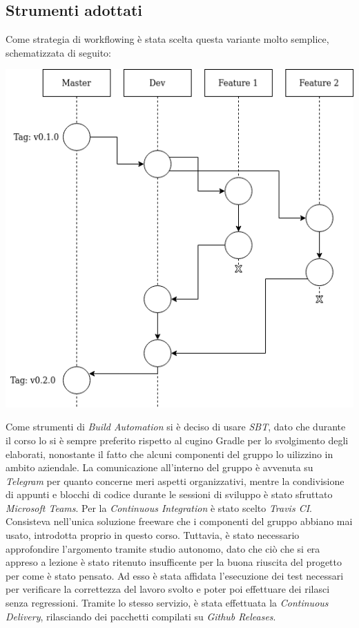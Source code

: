 \documentclass[a4paper,10pt]{report}
\begin{document}
    \subsection{Strumenti adottati}
    Come strategia di workflowing è stata scelta questa variante molto semplice, schematizzata di seguito:
    \begin{center}
        \includegraphics[width=\textwidth, scale=0.8]{git-workflow-1-1.png}
    \end{center}
    Come strumenti di \textit{Build Automation} si è deciso di usare \textit{SBT}, dato che durante il corso lo si è
    sempre preferito rispetto al cugino Gradle per lo svolgimento degli elaborati, nonostante il fatto che alcuni
    componenti del gruppo lo uilizzino in ambito aziendale.
    La comunicazione all'interno del gruppo è avvenuta su \textit{Telegram} per quanto concerne meri aspetti
    organizzativi, mentre la condivisione di appunti e blocchi di codice durante le sessioni di sviluppo è stato
    sfruttato \textit{Microsoft Teams}.
    Per la \textit{Continuous Integration} è stato scelto \textit{Travis CI}. Consisteva nell'unica soluzione freeware
    che i componenti del gruppo abbiano mai usato, introdotta proprio in questo corso. Tuttavia, è stato necessario
    approfondire l'argomento tramite studio autonomo, dato che ciò che si era appreso a lezione è stato ritenuto
    insufficente per la buona riuscita del progetto per come è stato pensato. Ad esso è stata affidata l'esecuzione dei
    test necessari per verificare la correttezza del lavoro svolto e poter poi effettuare dei rilasci senza regressioni.
    Tramite lo stesso servizio, è stata effettuata la \textit{Continuous Delivery}, rilasciando dei pacchetti compilati
    su \textit{Github Releases}.
\end{document}
